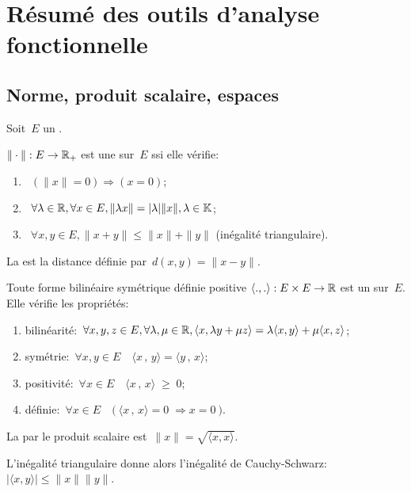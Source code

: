 \chapter*{Résumé des outils d'analyse fonctionnelle}

\section*{Norme, produit scalaire, espaces}

Soit~$E$ un .

\medskip
$\|\cdot\|: E\rightarrow \mathbb R_+$ est une  sur~$E$ ssi elle vérifie:
\begin{enumerate}
  \item~$(\|x\|=0) \Longrightarrow (x=0)$;
  \item~$\forall\lambda\in\mathbb R, \forall x\in E, \|\lambda x\|=|\lambda|\| x\|, \lambda\in\mathbb K$;
  \item~$\forall x,y\in E, \|x+y\|\le\|x\|+\|y\|$ (inégalité triangulaire).
\end{enumerate}

La  est la distance définie par~$d(x,y)=\|x-y\|$.

\medskip
Toute forme bilinéaire symétrique définie positive $\langle.,.\rangle: E\times E\rightarrow\mathbb R$ est un  sur~$E$. Elle vérifie les propriétés:
\begin{enumerate}
  \item bilinéarité:~$\forall x,y,z\in E, \forall\lambda,\mu\in\mathbb R, \langle x,\lambda y+\mu z\rangle
=\lambda\langle x,y\rangle+\mu\langle x,z\rangle$;
  \item symétrie:~$\forall x,y \in E \quad \langle x\, , \, y \rangle = \langle y\, , \, x\rangle$;
  \item positivité:~$\forall x \in E \quad \langle x\, , \, x \rangle \; \ge \; 0$;
  \item définie:~$\forall x \in E \quad \big(\ \langle x\, , \, x \rangle = 0 \; \Rightarrow x = 0\ \big)$.
\end{enumerate}

La  par le produit scalaire est~$\|x\|=\sqrt{\langle x,x\rangle}$.

L'inégalité triangulaire donne alors l'inégalité de Cauchy-Schwarz:~$|\langle x,y\rangle|\le\|x\| \|y\|$.

